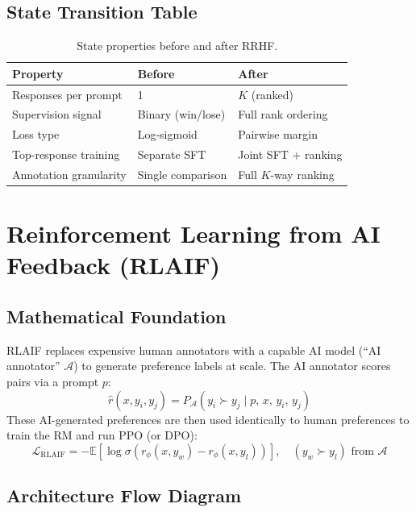 \subsection{State Transition Table}
\begin{table}[h]\centering
\begin{tabular}{lll}\toprule
\textbf{Property} & \textbf{Before} & \textbf{After}\\\midrule
Responses per prompt & 1 & $K$ (ranked)\\
Supervision signal & Binary (win/lose) & Full rank ordering\\
Loss type & Log-sigmoid & Pairwise margin\\
Top-response training & Separate SFT & Joint SFT + ranking\\
Annotation granularity & Single comparison & Full $K$-way ranking\\\bottomrule
\end{tabular}
\caption{State properties before and after RRHF.}
\end{table}

\newpage
\section{Reinforcement Learning from AI Feedback (RLAIF)}

\subsection{Mathematical Foundation}
RLAIF replaces expensive human annotators with a capable AI model (``AI annotator'' $\mathcal{A}$) to generate preference labels at scale. The AI annotator scores pairs via a prompt $p$:
\begin{equation}
  \hat{r}(x,y_i,y_j) = P_\mathcal{A}(y_i \succ y_j \mid p,\, x,\, y_i,\, y_j)
\end{equation}
These AI-generated preferences are then used identically to human preferences to train the RM and run PPO (or DPO):
\begin{equation}
  \mathcal{L}_{\text{RLAIF}} = -\mathbb{E}\!\left[\log\sigma\!\left(r_\phi(x,y_w) - r_\phi(x,y_l)\right)\right], \quad (y_w \succ y_l) \text{ from } \mathcal{A}
\end{equation}

\subsection{Architecture Flow Diagram}

